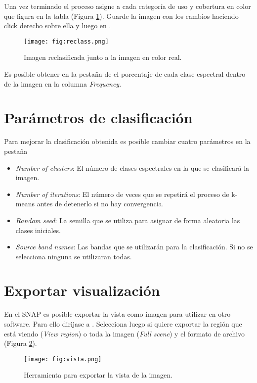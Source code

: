 Una vez terminado el proceso asigne a cada categoría de uso y cobertura en color que figura en la tabla (Figura \ref{fig:resclass}). Guarde la imagen con los cambios haciendo click derecho sobre ella y luego en .

\begin{figure}[h!]
    \centering
    \texttt{[image: fig:reclass.png]}
    \caption{Imagen reclasificada junto a la imagen en color real.}
    \label{fig:resclass}
\end{figure}

Es posible obtener en la pestaña de  el porcentaje de cada clase espectral dentro de la imagen en la columna \emph{Frequency}.

\section{Parámetros de clasificación}

Para mejorar la clasificación obtenida es posible cambiar cuatro parámetros en la pestaña 

\begin{itemize}
  \item \emph{Number of clusters}: El número de clases espectrales en la que se clasificará la imagen.
  \item \emph{Number of iterations}: El número de veces que se repetirá el proceso de k-means antes de detenerlo si no hay convergencia.
  \item \emph{Random seed}: La semilla que se utiliza para asignar de forma aleatoria las clases iniciales.
  \item \emph{Source band names}: Las bandas que se utilizarán para la clasificación. Si no se selecciona ninguna se utilizaran todas.
\end{itemize}

\section{Exportar visualización}

En el SNAP es posible exportar la vista como imagen para utilizar en otro software. Para ello dirijase a . Selecciona luego si quiere exportar la región que está viendo (\emph{View region}) o toda la imagen (\emph{Full scene}) y el formato de archivo (Figura \ref{fig:vista}).

\begin{figure}[h!]
    \centering
    \texttt{[image: fig:vista.png]}
    \caption{Herramienta para exportar la vista de la imagen.}
    \label{fig:vista}
\end{figure}

